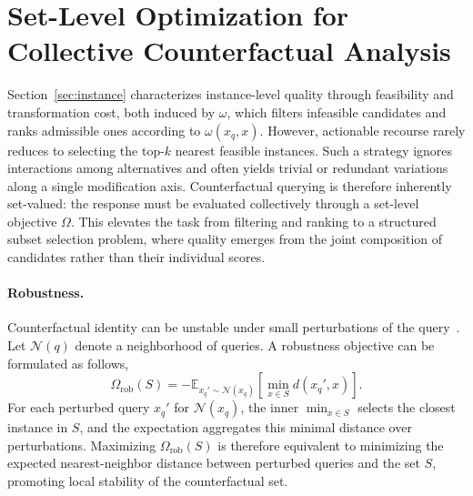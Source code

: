 \section{Set-Level Optimization for Collective Counterfactual Analysis}

\label{sec:set}

Section~\ref{sec:instance} characterizes instance-level quality through feasibility and transformation cost, both induced by $\omega$, which filters infeasible candidates and ranks admissible ones according to $\omega(x_q,x)$. However, actionable recourse rarely reduces to selecting the top-$k$ nearest feasible instances. Such a strategy ignores interactions among alternatives and often yields trivial or redundant variations along a single modification axis. Counterfactual querying is therefore inherently set-valued: the response must be evaluated collectively through a set-level objective $\Omega$. This elevates the task from filtering and ranking to a structured subset selection problem, where quality emerges from the joint composition of candidates rather than their individual scores.

\paragraph{Robustness.}
Counterfactual identity can be unstable under small perturbations of the query~\cite{guyomard2023generating}. Let $\mathcal N(q)$ denote a neighborhood of queries. A robustness objective can be formulated as follows,
\begingroup\small
\begin{equation}
\Omega_{\text{rob}}(S) = -\mathbb E_{x_q'\sim\mathcal N(x_q)} \left[ \min_{x\in S} d(x_q',x) \right].
\end{equation}
\endgroup
For each perturbed query $x_q'$ for $\mathcal N(x_q)$, the inner $\min_{x \in S}$ selects the closest instance in $S$, and the expectation aggregates this minimal distance over perturbations. Maximizing $\Omega_{\text{rob}}(S)$ is therefore equivalent to minimizing the expected nearest-neighbor distance between perturbed queries and the set $S$, promoting local stability of the counterfactual set.

